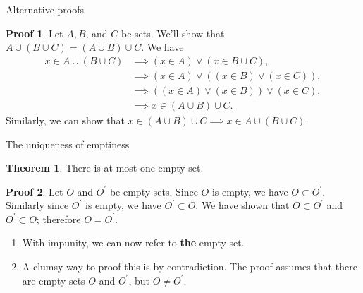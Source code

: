 \documentclass[fleqn]{beamer}
\theoremstyle{definition}
\newtheorem{myth}{Theorem}
\newtheorem{myproof}{Proof}
\begin{document}
\begin{frame}{Alternative proofs}


\begin{myproof}  Let \(A,B\), and \(C\) be sets.  We'll show that \(A \cup (B \cup C) =  (A \cup B) \cup C\).  
We have 
\begin{align*}
  x \in A \cup (B \cup C)  &\implies (x \in A) \lor (x \in B \cup C), \\
                                            &\implies  (x \in A) \lor ( (x \in  B) \lor (x \in C)), \\
                                           &  \implies  (  (x \in A) \lor  (x \in  B) ) \lor (x \in C), \\
                                           & \implies x \in  ( A \cup B)  \cup C.
\end{align*}
Similarly, we can show that \(   x \in (A \cup B) \cup C \implies x \in A \cup (B \cup C)\).
\end{myproof}

\end{frame}
\begin{frame}{The uniqueness of emptiness}

\begin{myth} There is at most one empty set. \end{myth}

\begin{myproof} Let \(O\) and \(O^\prime\) be empty sets.  Since  \(O\) is empty, we have \(O \subset O^\prime\). Similarly since   \(O^\prime \) is empty, we have \(O^\prime  \subset O\). We have shown that \(O \subset O^\prime\) and \(O^\prime  \subset O\); therefore \(O = O^\prime\). \end{myproof} 

\begin{enumerate}

\item With impunity, we can now refer to  \textbf{the} empty set. 

\item A clumsy  way to proof this is by contradiction. The proof assumes that there are empty sets \(O\) and \(O^\prime\), but \(O \neq O^\prime\).

\end{enumerate}
\end{frame}
\end{document}

